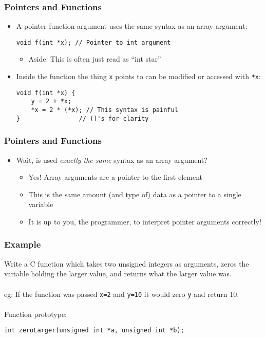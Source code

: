 \documentclass[14pt]{beamer}
\begin{document}
\begin{frame}[fragile]
\frametitle{Pointers and Functions}
\begin{itemize}
\item A pointer function argument uses the same syntax as an array argument:
\begin{lstlisting}[style=CStyle]
void f(int *x); // Pointer to int argument
\end{lstlisting}
	\begin{itemize}
		\item Aside: This is often just read as ``int star''	
	\end{itemize}
\item Inside the function the thing \texttt{x} points to can be modified or accessed with \texttt{*x}:
\begin{lstlisting}[style=CStyle]
void f(int *x) {
	y =	2 + *x;
	*x = 2 * (*x); // This syntax is painful
}                // ()'s for clarity

\end{lstlisting}
\end{itemize}
\end{frame}

\begin{frame}
\frametitle{Pointers and Functions}
\begin{itemize}
\item Wait, is used \textit{exactly the same} syntax as an array argument?
\pause
	\begin{itemize}
		\item Yes! Array arguments are a pointer to the first element
		\item This is the same amount (and type of) data as a pointer to a single variable
		\item It is up to you, the programmer, to interpret pointer arguments correctly!
	\end{itemize}
\end{itemize}
\end{frame}

\begin{frame}[fragile]
\frametitle{Example}
Write a C function which takes two unsigned integers as arguments, zeros the variable holding the larger value, and returns what the larger value was.
\\~\\
eg: If the function was passed \texttt{x=2} and \texttt{y=10} it would zero \texttt{y} and return 10.
\\~\\
Function prototype:
\begin{lstlisting}[style=CStyle]
int zeroLarger(unsigned int *a, unsigned int *b);
\end{lstlisting}
\end{frame}
\end{document}
